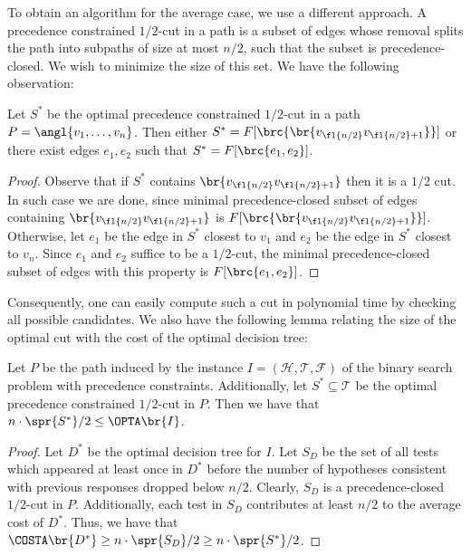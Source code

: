 To obtain an algorithm for the average case, we use a different approach.
A precedence constrained $1/2$-cut in a path is a subset of edges whose removal splits the path into subpaths of size at most $n/2$, such that the subset is precedence-closed. We wish to minimize the size of this set. We have the following observation:
\begin{lemma}\label{lemma:optimal_half_cut}
    Let $S^*$ be the optimal precedence constrained $1/2$-cut in a path $P=\angl{v_1,\dots, v_n}$. Then either $S^* = F[\brc{\br{v_{\fl{n/2}}v_{\fl{n/2}+1}}}]$ or there exist edges $e_1, e_2$ such that $S^*=F[\brc{e_1, e_2}]$.
\end{lemma}
\begin{proof}
    Observe that if $S^*$ contains $\br{v_{\fl{n/2}}v_{\fl{n/2}+1}}$ then it is a $1/2$ cut. In such case we are done, since minimal precedence-closed subset of edges containing $\br{v_{\fl{n/2}}v_{\fl{n/2}+1}}$ is $F[\brc{\br{v_{\fl{n/2}}v_{\fl{n/2}+1}}}]$. Otherwise, let $e_1$ be the edge in $S^*$ closest to $v_1$ and $e_2$ be the edge in $S^*$ closest to $v_n$. Since $e_1$ and $e_2$ suffice to be a $1/2$-cut, the minimal precedence-closed subset of edges with this property is $F[\brc{e_1, e_2}]$.
\end{proof}

Consequently, one can easily compute such a cut in polynomial time by checking all possible candidates. We also have the following lemma relating the size of the optimal cut with the cost of the optimal decision tree:
\begin{lemma}\label{lemma:cutcost}
    Let $P$ be the path induced by the instance $I = (\mathcal{H}, \mathcal{T}, \mathcal{F})$ of the binary search problem with precedence constraints. Additionally, let $S^*\subseteq \mathcal{T}$ be the optimal precedence constrained $1/2$-cut in $P$. Then we have that $n\cdot\spr{S^*}/2\leq \OPTA\br{I}$.
\end{lemma}
\begin{proof}
    Let $D^*$ be the optimal decision tree for $I$. Let $S_D$ be the set of all tests which appeared at least once in $D^*$ before the number of hypotheses consistent with previous responses dropped below $n/2$. Clearly, $S_D$ is a precedence-closed $1/2$-cut in $P$. Additionally, each test in $S_D$ contributes at least $n/2$ to the average cost of $D^*$. Thus, we have that $\COSTA\br{D^*}\geq n\cdot \spr{S_D}/2 \geq n\cdot \spr{S^*}/2$.
\end{proof}

